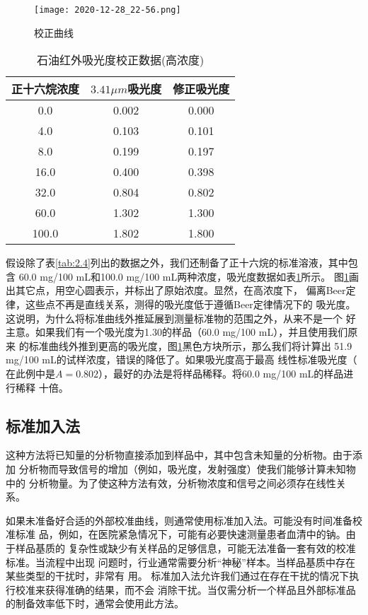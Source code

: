 \begin{figure}[htpb]
    \centering
    \texttt{[image: 2020-12-28\_22-56.png]}
    \caption{校正曲线}
    \label{fig:2.12}
\end{figure}
\begin{table}[htbp]
    \centering
    \caption{石油红外吸光度校正数据(高浓度)}
    \label{tab:2.5}
    \begin{tabular}{ccc}
        \hline
        正十六烷浓度 & $3.41\mu m$吸光度  &  修正吸光度\\
        \hline
        0.0  &  0.002   &  0.000  \\
        4.0  &  0.103   &  0.101  \\
        8.0  &  0.199   &  0.197  \\
        16.0  &  0.400   &  0.398  \\
        32.0  &  0.804   &  0.802  \\
        60.0  &  1.302   &  1.300  \\
        100.0  &  1.802   &  1.800  \\
        \hline
    \end{tabular}
\end{table}

假设除了表\ref{tab:2.4}列出的数据之外，我们还制备了正十六烷的标准溶液，其中包含
60.0 mg/100 mL和100.0 mg/100 mL两种浓度，吸光度数据如表\ref{tab:2.5}所示。
图\ref{fig:2.12}画出其它点，用空心圆表示，并标出了原始浓度。显然，在高浓度下，
偏离Beer定律，这些点不再是直线关系，测得的吸光度低于遵循Beer定律情况下的
吸光度。这说明，为什么将标准曲线外推延展到测量标准物的范围之外，从来不是一个
好主意。如果我们有一个吸光度为1.30的样品（60.0 mg/100 mL），并且使用我们原来
的标准曲线外推到更高的吸光度，图\ref{fig:2.12}黑色方块所示，那么我们将计算出
51.9 mg/100 mL的试样浓度，错误的降低了。如果吸光度高于最高 线性标准吸光度（
在此例中是$A=0.802$），最好的办法是将样品稀释。将60.0 mg/100 mL的样品进行稀释
十倍。
\subsection{标准加入法}
这种方法将已知量的分析物直接添加到样品中，其中包含未知量的分析物。由于添加
分析物而导致信号的增加（例如，吸光度，发射强度）使我们能够计算未知物中的
分析物量。为了使这种方法有效，分析物浓度和信号之间必须存在线性关系。

如果未准备好合适的外部校准曲线，则通常使用标准加入法。可能没有时间准备校准标准
品，例如，在医院紧急情况下，可能有必要快速测量患者血清中的钠。由于样品基质的
复杂性或缺少有关样品的足够信息，可能无法准备一套有效的校准标准。当流程中出现
问题时，行业通常需要分析``神秘''样本。当样品基质中存在某些类型的干扰时，非常有
用。 标准加入法允许我们通过在存在干扰的情况下执行校准来获得准确的结果，而不会
消除干扰。当仅需分析一个样品且外部标准品的制备效率低下时，通常会使用此方法。


